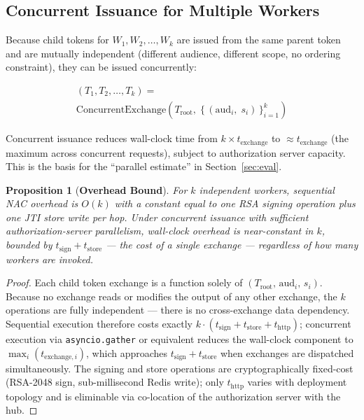 \documentclass[journal]{IEEEtran}
\newtheorem{proposition}{Proposition}           %
\theoremstyle{definition}
\begin{document}
\subsection{Concurrent Issuance for Multiple Workers}

Because child tokens for $W_1, W_2, \ldots, W_k$ are issued from the same parent
token and are mutually independent (different audience, different scope, no
ordering constraint), they can be issued concurrently:

\begin{multline}
(T_1, T_2, \ldots, T_k) = \\
\mathrm{ConcurrentExchange}\!\left(
  T_{\mathrm{root}},\;
  \bigl\{\,(\mathrm{aud}_i,\; s_i)\,\bigr\}_{i=1}^{k}
\right)
\label{eq:concurrent}
\end{multline}

Concurrent issuance reduces wall-clock time from $k \times t_{\mathrm{exchange}}$
to $\approx t_{\mathrm{exchange}}$ (the maximum across concurrent requests),
subject to authorization server capacity. This is the basis for the
``parallel estimate'' in Section~\ref{sec:eval}.

\begin{proposition}[\textbf{Overhead Bound}]
\label{prop:overhead}
For $k$ independent workers, sequential NAC overhead is $O(k)$ with a
constant equal to one RSA signing operation plus one JTI store write
per hop. Under concurrent issuance with sufficient authorization-server parallelism,
wall-clock overhead is near-constant in $k$, bounded by
$t_{\mathrm{sign}} + t_{\mathrm{store}}$ --- the cost of a single
exchange --- regardless of how many workers are invoked.
\end{proposition}
\begin{proof}
Each child token exchange is a function solely of
$(T_{\mathrm{root}},\, \mathrm{aud}_i,\, s_i)$. Because no exchange reads or
modifies the output of any other exchange, the $k$ operations are fully
independent --- there is no cross-exchange data dependency. Sequential
execution therefore costs exactly $k \cdot (t_{\mathrm{sign}} +
t_{\mathrm{store}} + t_{\mathrm{http}})$; concurrent execution via
\texttt{asyncio.gather} or equivalent reduces the wall-clock component to
$\max_i(t_{\mathrm{exchange},i})$, which approaches $t_{\mathrm{sign}} +
t_{\mathrm{store}}$ when exchanges are dispatched simultaneously. The signing
and store operations are cryptographically fixed-cost (RSA-2048 sign,
sub-millisecond Redis write); only $t_{\mathrm{http}}$ varies with deployment
topology and is eliminable via co-location of the authorization server with
the hub.
\end{proof}
\end{document}
